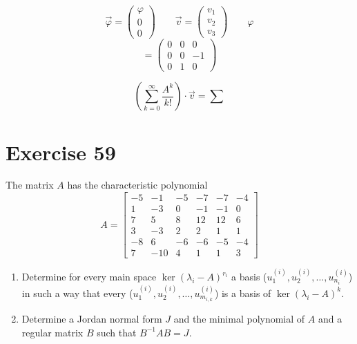 \documentclass[a4paper]{article}
\theoremstyle{definition}
\begin{document}
\[
  \vec\varphi = \begin{pmatrix} \varphi \\ 0 \\ 0 \end{pmatrix} \qquad
  \vec v = \begin{pmatrix} v_1 \\ v_2 \\ v_3 \end{pmatrix} \qquad
  \varphi
\]
\[ = \begin{pmatrix} 0 & 0 & 0 \\ 0 & 0 & -1 \\ 0 & 1 & 0 \end{pmatrix} \]

\[ \left(\sum_{k=0}^\infty \frac{A^k}{k!}\right) \cdot \vec v = \sum \]

\section{Exercise 59}
\begin{ex}
  The matrix $A$ has the characteristic polynomial
  \[
    A = \begin{bmatrix}
      -5 & -1 & -5 & -7 & -7 & -4 \\
      1 & -3 & 0 & -1 & -1 & 0 \\
      7 & 5 & 8 & 12 & 12 & 6 \\
      3 & -3 & 2 & 2 & 1 & 1 \\
      -8 & 6 & -6 & -6 & -5 & -4 \\
      7 & -10 & 4 & 1 & 1 & 3
    \end{bmatrix}
  \]
  \begin{enumerate}
    \item Determine for every main space $\ker(\lambda_i - A)^{r_i}$ a basis ($u_1^{(i)}, u_2^{(i)}, \dots, u_{n_i}^{(i)}$) in such a way that every ($u_1^{(i)}, u_2^{(i)}, \dots, u_{m_{i,k}}^{(i)}$) is a basis of $\operatorname{ker}(\lambda_i - A)^k$.
    \item Determine a Jordan normal form $J$ and the minimal polynomial of $A$ and a regular matrix $B$ such that $B^{-1}AB = J$.
  \end{enumerate}
\end{ex}
\end{document}
